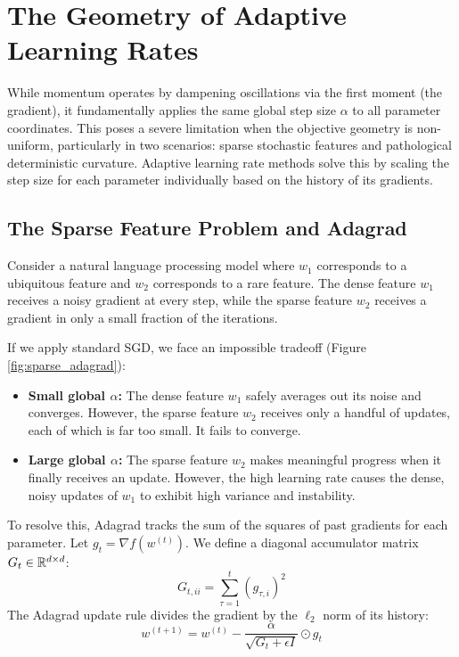 \section{The Geometry of Adaptive Learning Rates}
\label{sec:adaptive}

While momentum operates by dampening oscillations via the first moment (the gradient), it fundamentally applies the same global step size $\alpha$ to all parameter coordinates. This poses a severe limitation when the objective geometry is non-uniform, particularly in two scenarios: sparse stochastic features and pathological deterministic curvature. Adaptive learning rate methods solve this by scaling the step size for each parameter individually based on the history of its gradients.

\subsection{The Sparse Feature Problem and Adagrad}
Consider a natural language processing model where $w_1$ corresponds to a ubiquitous feature and $w_2$ corresponds to a rare feature. The dense feature $w_1$ receives a noisy gradient at every step, while the sparse feature $w_2$ receives a gradient in only a small fraction of the iterations.

If we apply standard SGD, we face an impossible tradeoff (Figure \ref{fig:sparse_adagrad}):
\begin{itemize}
    \item \textbf{Small global $\alpha$:} The dense feature $w_1$ safely averages out its noise and converges. However, the sparse feature $w_2$ receives only a handful of updates, each of which is far too small. It fails to converge.
    \item \textbf{Large global $\alpha$:} The sparse feature $w_2$ makes meaningful progress when it finally receives an update. However, the high learning rate causes the dense, noisy updates of $w_1$ to exhibit high variance and instability.
\end{itemize}

To resolve this, Adagrad \cite{duchi2011adaptive} tracks the sum of the squares of past gradients for each parameter. Let $g_t = \nabla f(w^{(t)})$. We define a diagonal accumulator matrix $G_t \in \mathbb R^{d \times d}$:
\begin{equation}
    G_{t, ii} = \sum_{\tau=1}^t (g_{\tau, i})^2
\end{equation}
The Adagrad update rule divides the gradient by the $\ell_2$ norm of its history:
\begin{equation}
    w^{(t+1)} = w^{(t)} - \frac{\alpha}{\sqrt{G_t + \epsilon I}} \odot g_t
\end{equation}

